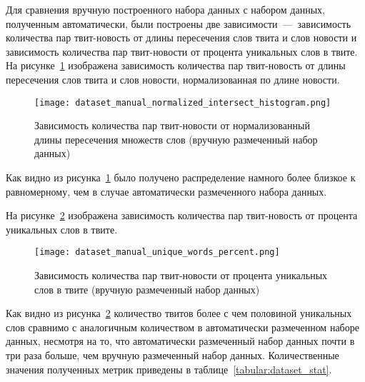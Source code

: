         Для сравнения вручную построенного набора данных с набором данных, полученным автоматически, были построены две
        зависимости~---~зависимость количества пар твит-новость от длины пересечения слов твита и слов новости и зависимость количества пар твит-новости от процента уникальных слов в твите.
        На рисунке~\ref{pic:manual_histogram} изображена зависимость количества пар твит-новость от длины пересечения слов твита и слов новости, нормализованная по длине новости.
        \begin{figure}[h!]
            \center
            \texttt{[image: dataset\_manual\_normalized\_intersect\_histogram.png]}
            \caption{Зависимость количества пар твит-новости от нормализованный длины пересечения множеств слов (вручную размеченный набор данных)}
            \label{pic:manual_histogram}
        \end{figure}
        Как видно из рисунка~\ref{pic:manual_histogram} было получено распределение намного более близкое к равномерному, чем в случае автоматически размеченного набора данных.

        На рисунке~\ref{pic:manual_percent} изображена зависимость количества пар твит-новость от процента уникальных слов в твите.
        \begin{figure}[h!]
            \center
            \texttt{[image: dataset\_manual\_unique\_words\_percent.png]}
            \caption{Зависимость количества пар твит-новости от процента уникальных слов в твите (вручную размеченный набор данных)}
            \label{pic:manual_percent}
        \end{figure}
        Как видно из рисунка~\ref{pic:manual_percent} количество твитов более с чем половиной уникальных слов сравнимо с аналогичным количеством в автоматически размеченном наборе данных,
        несмотря на то, что автоматически размеченный набор данных почти в три раза больше, чем вручную размеченный набор данных.
        Количественные значения полученных метрик приведены в таблице~\ref{tabular:dataset_stat}.

